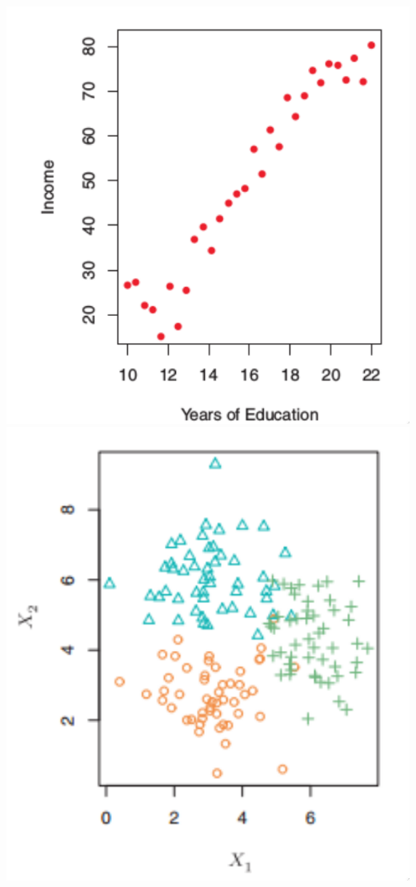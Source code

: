 \documentclass[leqno, 10pt, envcountsect]{beamer}
\numberwithin{equation}{section}
\theoremstyle{definition}
\theoremstyle{example}
\numberwithin{figure}{section}
\numberwithin{table}{section}
\begin{document}
\begin{frame}
\begin{center}
    \includegraphics[scale=0.16]{supervised.png}
    \includegraphics[scale=0.17]{unsupervised.png}
  \end{center}
\end{frame}
\end{document}
